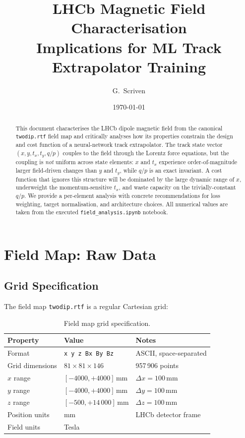 \documentclass[11pt,a4paper]{article}
\title{LHCb Magnetic Field Characterisation\\[4pt]
\large Implications for ML Track Extrapolator Training}
\author{G.\ Scriven}
\date{\today}
\begin{document}
\maketitle

\begin{abstract}
This document characterises the LHCb dipole magnetic field from the
canonical \texttt{twodip.rtf} field map and critically analyses how its
properties constrain the design and cost function of a neural-network
track extrapolator.
The track state vector $(x, y, t_x, t_y, q/p)$ couples to the field
through the Lorentz force equations, but the coupling is \emph{not}
uniform across state elements: $x$ and $t_x$ experience order-of-magnitude
larger field-driven changes than $y$ and $t_y$, while $q/p$ is an
exact invariant.
A cost function that ignores this structure will be dominated by the
large dynamic range of $x$, underweight the momentum-sensitive $t_x$,
and waste capacity on the trivially-constant $q/p$.
We provide a per-element analysis with concrete recommendations for
loss weighting, target normalisation, and architecture choices.
All numerical values are taken from the executed
\texttt{field\_analysis.ipynb} notebook.
\end{abstract}

\tableofcontents
\newpage

\section{Field Map: Raw Data}
\label{sec:raw}

\subsection{Grid Specification}

The field map \texttt{twodip.rtf} is a regular Cartesian grid:

\begin{table}[h]
\centering
\caption{Field map grid specification.}
\label{tab:grid}
\begin{tabular}{lll}
\toprule
\textbf{Property} & \textbf{Value} & \textbf{Notes} \\
\midrule
Format          & \texttt{x y z Bx By Bz} & ASCII, space-separated \\
Grid dimensions & $81 \times 81 \times 146$ & 957\,906 points \\
$x$ range       & $[-4000, +4000]$\,mm     & $\Delta x = 100$\,mm \\
$y$ range       & $[-4000, +4000]$\,mm     & $\Delta y = 100$\,mm \\
$z$ range       & $[-500, +14\,000]$\,mm   & $\Delta z = 100$\,mm \\
Position units  & mm & LHCb detector frame \\
Field units     & Tesla & \\
\bottomrule
\end{tabular}
\end{table}
\end{document}
